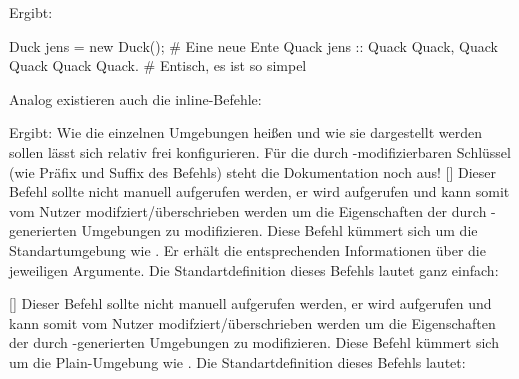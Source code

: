 Ergibt:
\begin{rubberduck}
Duck jens = new Duck(); # Eine neue Ente
Quack jens ::{
    Quack Quack, Quack Quack
    Quack Quack. # Entisch, es ist so simpel
}
\end{rubberduck}
Analog existieren auch die inline-Befehle:
\begin{latex}[morekeywords={[5]{\\prubberduck}}]
\end{latex}
Ergibt: 
\medskip\newline
Wie die einzelnen Umgebungen heißen und wie sie dargestellt werden sollen lässt sich relativ frei konfigurieren. Für die durch -modifizierbaren Schlüssel (wie Präfix und Suffix des Befehls) steht die Dokumentation noch aus!\newline
%
%
%
[]
Dieser Befehl sollte nicht manuell aufgerufen werden, er wird aufgerufen und kann somit vom Nutzer modifziert/überschrieben werden um die Eigenschaften der durch -generierten Umgebungen zu modifizieren. Diese Befehl kümmert sich um die Standartumgebung wie . Er erhält die entsprechenden Informationen über die jeweiligen Argumente. Die Standartdefinition dieses Befehls lautet ganz einfach:
%
%
%
[\secline{}]
Dieser Befehl sollte nicht manuell aufgerufen werden, er wird aufgerufen und kann somit vom Nutzer modifziert/überschrieben werden um die Eigenschaften der durch -generierten Umgebungen zu modifizieren. Diese Befehl kümmert sich um die Plain-Umgebung wie .
Die Standartdefinition dieses Befehls lautet:
